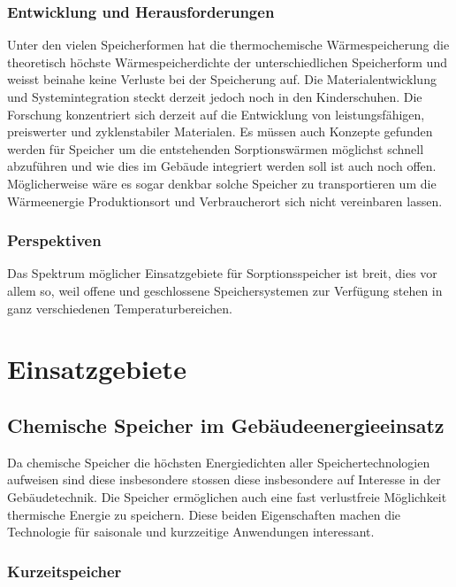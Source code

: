 \documentclass[11pt,a4paper]{scrartcl}
\begin{document}
\subsubsection{Entwicklung und Herausforderungen}
Unter den vielen Speicherformen hat die thermochemische Wärmespeicherung die theoretisch höchste Wärmespeicherdichte der unterschiedlichen Speicherform und weisst beinahe keine Verluste bei der Speicherung auf. Die Materialentwicklung und Systemintegration steckt derzeit jedoch noch in den Kinderschuhen. 
Die Forschung konzentriert sich derzeit auf die Entwicklung von leistungsfähigen, preiswerter und zyklenstabiler Materialen. Es müssen auch Konzepte gefunden werden für Speicher um die entstehenden Sorptionswärmen möglichst schnell abzuführen und wie dies im Gebäude integriert werden soll ist auch noch offen. Möglicherweise wäre es sogar denkbar solche Speicher zu transportieren um die Wärmeenergie Produktionsort und Verbraucherort sich nicht vereinbaren lassen.

\subsubsection{Perspektiven}
Das Spektrum möglicher Einsatzgebiete für Sorptionsspeicher ist breit, dies vor allem so, weil offene und geschlossene Speichersystemen zur Verfügung stehen in ganz verschiedenen Temperaturbereichen. 




\newpage
\section{Einsatzgebiete}
\subsection{Chemische Speicher im Gebäudeenergieeinsatz}
Da chemische Speicher die höchsten Energiedichten aller Speichertechnologien
aufweisen sind diese insbesondere stossen diese insbesondere auf Interesse in
der Gebäudetechnik. Die Speicher ermöglichen auch eine fast verlustfreie
Möglichkeit thermische Energie zu speichern. Diese beiden Eigenschaften machen
die Technologie für saisonale und kurzzeitige Anwendungen interessant.

\subsubsection{Kurzeitspeicher}
\end{document}
